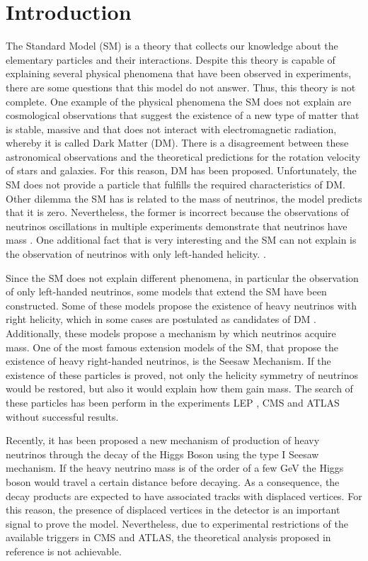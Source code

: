 \chapter{Introduction}
\label{Introduction_chapter}

The Standard Model (SM) is a theory that collects our knowledge about the elementary particles and their interactions. Despite this theory is capable of explaining several physical phenomena that have been observed in experiments, there are some questions that this model do not answer. Thus, this theory is not complete. One example of the physical phenomena the SM does not explain are cosmological observations that suggest the existence of a new type of matter that is stable, massive and that does not interact with electromagnetic radiation, whereby it is called Dark Matter (DM). There is a disagreement between these astronomical observations and the theoretical predictions for the rotation velocity of stars and galaxies. For this reason, DM has been proposed. Unfortunately, the SM does not provide a particle that fulfills the required characteristics of DM. Other dilemma the SM has is related to the mass of neutrinos, the model predicts that it is zero. Nevertheless, the former is incorrect because the observations of neutrinos oscillations in multiple experiments demonstrate that neutrinos have mass \cite{Neutrino experiment 1 mass, Neutrino experiment 2 mass}. One additional fact that is very interesting and the SM can not explain is the observation of neutrinos with only left-handed helicity. . 

Since the SM does not explain different phenomena, in particular the observation of only left-handed neutrinos, some models that extend the SM have been constructed. Some of these models propose the existence of heavy neutrinos with right helicity, which in some cases are postulated as candidates of DM \cite{Neutrino dark matter candidate 1, Neutrino dark matter candidate 2}. Additionally, these models propose a mechanism by which neutrinos acquire mass. One of the most famous extension models of the SM, that propose the existence of heavy right-handed neutrinos, is the Seesaw Mechanism. If the existence of these particles is proved, not only the helicity symmetry of neutrinos would be restored, but also it would explain how them gain mass. The search of these particles has been perform in the experiments LEP \cite{Lep experiment}, CMS \cite{CMS experiment} and ATLAS \cite{ATLAS experiment} without successful results.

Recently, it has been proposed a new mechanism of production of heavy neutrinos through the decay of the Higgs Boson \cite{Seesaw Mechanism with displaced vertices} using the type I Seesaw mechanism. If the heavy neutrino mass is of the order of a few GeV the Higgs boson would travel a certain distance before decaying. As a consequence, the decay products are expected to have associated tracks with displaced vertices. For this reason, the presence of displaced vertices in the detector is an important signal to prove the model. Nevertheless, due to experimental restrictions of the available triggers in CMS and ATLAS, the theoretical analysis proposed in reference \cite{Seesaw Mechanism with displace vertices} is not achievable. 

